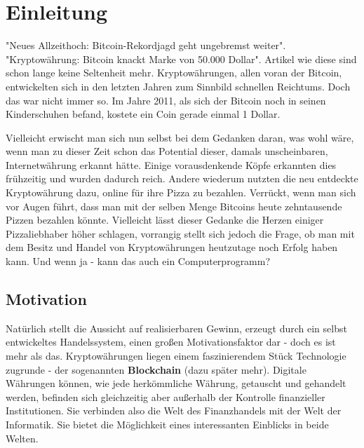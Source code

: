 \documentclass[oneside]{ausarbeitung}
\begin{document}
\cleardoublepage
{}
\setcounter{page}{1}

\chapter{Einleitung}
\label{cha:einleitung}

"Neues Allzeithoch: Bitcoin-Rekordjagd geht ungebremst
weiter"\cite{bitcoin_artikel_1}. "Kryptowährung: Bitcoin knackt Marke
von 50.000 Dollar"\cite{bitcoin_artikel_2}. Artikel wie diese sind
schon lange keine Seltenheit mehr. Kryptowährungen, allen voran der
Bitcoin, entwickelten sich in den letzten Jahren zum Sinnbild
schnellen Reichtums. Doch das war nicht immer so. Im Jahre 2011, als
sich der Bitcoin noch in seinen Kinderschuhen befand, kostete ein Coin
gerade einmal 1 Dollar\cite{bitcoin_kurs_2011}. 

Vielleicht erwischt
man sich nun selbst bei dem Gedanken daran, was wohl wäre, wenn man
zu dieser Zeit schon das Potential dieser, damals unscheinbaren,
Internetwährung erkannt hätte. Einige vorausdenkende Köpfe
erkannten dies frühzeitig und wurden dadurch reich. Andere wiederum
nutzten die neu entdeckte Kryptowährung dazu, online für ihre Pizza
zu bezahlen. Verrückt, wenn man sich vor Augen führt, dass man mit
der selben Menge Bitcoins heute zehntausende Pizzen bezahlen könnte.
Vielleicht lässt dieser Gedanke die Herzen einiger Pizzaliebhaber
höher schlagen, vorrangig stellt sich jedoch die Frage, ob man mit
dem Besitz und Handel von Kryptowährungen heutzutage noch Erfolg
haben kann. Und wenn ja - kann das auch ein Computerprogramm?


\section{Motivation}
\label{sec:motivation}

Natürlich stellt die Aussicht auf realisierbaren Gewinn, erzeugt
durch ein selbst entwickeltes Handelssystem, einen großen
Motivationsfaktor dar - doch es ist mehr als das. Kryptowährungen
liegen einem faszinierendem Stück Technologie zugrunde - der
sogenannten \textbf{Blockchain} (dazu später mehr). Digitale Währungen 
können, wie jede herkömmliche Währung, getauscht und
gehandelt werden, befinden sich gleichzeitig aber außerhalb der
Kontrolle finanzieller Institutionen. Sie verbinden also
die Welt des Finanzhandels mit der Welt der Informatik. Sie bietet die
Möglichkeit eines interessanten Einblicks in beide Welten. 
\end{document}
